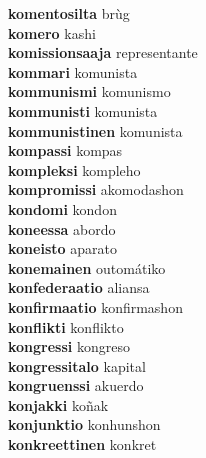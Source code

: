 \textbf{komentosilta } brùg \\
\textbf{komero } kashi \\
\textbf{komissionsaaja } representante \\
\textbf{kommari } komunista \\
\textbf{kommunismi } komunismo \\
\textbf{kommunisti } komunista \\
\textbf{kommunistinen } komunista \\
\textbf{kompassi } kompas \\
\textbf{kompleksi } kompleho \\
\textbf{kompromissi } akomodashon \\
\textbf{kondomi } kondon \\
\textbf{koneessa } abordo \\
\textbf{koneisto } aparato \\
\textbf{konemainen } outomátiko \\
\textbf{konfederaatio } aliansa \\
\textbf{konfirmaatio } konfirmashon \\
\textbf{konflikti } konflikto \\
\textbf{kongressi } kongreso \\
\textbf{kongressitalo } kapital \\
\textbf{kongruenssi } akuerdo \\
\textbf{konjakki } koñak \\
\textbf{konjunktio } konhunshon \\
\textbf{konkreettinen } konkret \\
